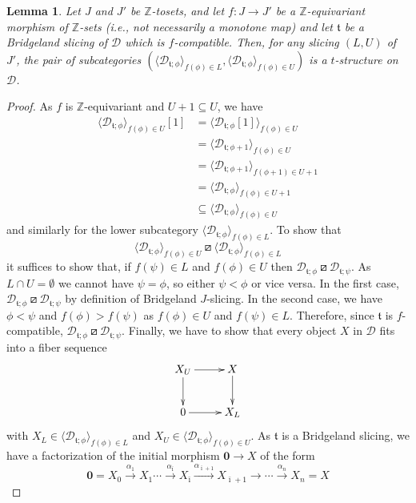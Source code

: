 \documentclass{article}
\newtheorem{lem}[thm]{Lemma}
\theoremstyle{definition}
\newcommand{\Z}{\mathbb{Z}}
\newcommand{\tee}{\mathfrak{t}}
\newcommand{\orth}{\boxslash}
\begin{document}
\begin{lem}\label{is-t-structure}
Let $J$ and $J'$ be $\Z$-tosets, and let $f\colon J\to J'$ be a $\Z$-equivariant morphism of $\Z$-sets (i.e., not necessarily a monotone map) and let $\tee$ be a Bridgeland slicing of $\mathscr{D}$ which is $f$-compatible. Then, for any slicing $(L,U)$ of $J'$, the pair of subcategories
$(\langle \mathscr{D}_{\tee;\phi}\rangle_{f(\phi)\in L},\langle \mathscr{D}_{\tee;\phi}\rangle_{f(\phi)\in U})$ is a $t$-structure on $\mathscr{D}$.
\end{lem}
\begin{proof}
As $f$ is $\Z$-equivariant and $U+1\subseteq U$, we have
\begin{align*}
\langle \mathscr{D}_{\tee;\phi}\rangle_{f(\phi)\in U}[1]&=\langle \mathscr{D}_{\tee;\phi}[1]\rangle_{f(\phi)\in U}\\
&=\langle \mathscr{D}_{\tee;\phi+1}\rangle_{f(\phi)\in U}\\
&=\langle \mathscr{D}_{\tee;\phi+1}\rangle_{f(\phi+1)\in U+1}\\
&=\langle \mathscr{D}_{\tee;\phi}\rangle_{f(\phi)\in U+1}\\
&\subseteq \langle \mathscr{D}_{\tee;\phi}\rangle_{f(\phi)\in U}
\end{align*}
and similarly for the lower subcategory $\langle \mathscr{D}_{\tee;\phi}\rangle_{f(\phi)\in L}$. To show that 
\[
\langle \mathscr{D}_{\tee;\phi}\rangle_{f(\phi)\in U}\orth \langle \mathscr{D}_{\tee;\phi}\rangle_{f(\phi)\in L}
\]
it suffices to show that, if $f(\psi)\in L$ and $f(\phi)\in U$ then $\mathscr{D}_{\tee;\phi}\orth \mathscr{D}_{\tee;\psi}$. As $L\cap U=\emptyset$ we cannot have $\psi=\phi$, so either $\psi<\phi$ or vice versa. In the first case, $\mathscr{D}_{\tee;\phi}\orth \mathscr{D}_{\tee;\psi}$ by definition of Bridgeland $J$-slicing. In the second case, we have $\phi<\psi$ and $f(\phi)>f(\psi)$ as $f(\phi)\in U$ and  $f(\psi)\in L$. Therefore, since $\tee$ is $f$-compatible, $\mathscr{D}_{\tee;\phi}\orth\mathscr{D}_{\tee;\psi}$. Finally, we have to show that every object $X$ in $\mathscr{D}$ fits into a fiber sequence
\[
\xymatrix{
X_U\ar[r]\ar[d] & X\ar[d]\\
0\ar[r] & X_L
}
\]
with $X_L\in \langle \mathscr{D}_{\tee;\phi}\rangle_{f(\phi)\in L}$ and $X_U\in \langle \mathscr{D}_{\tee;\phi}\rangle_{f(\phi)\in U}$. As $\tee$ is a Bridgeland slicing, we have a factorization of the initial morphism $\mathbf{0} \to X$ of the form
\[
\mathbf{0}=X_0 \xrightarrow{\alpha_1} X_1\cdots \xrightarrow{\alpha_{{\bar\imath}}}X_{{\bar\imath}}\xrightarrow{\alpha_{{\bar\imath}+1}}X_{{\bar\imath}+1}\xrightarrow{}\cdots \xrightarrow{\alpha_n} X_n=X
\]
\end{proof}
\end{document}
